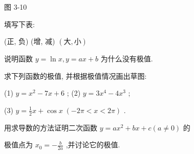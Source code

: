 \documentclass[lang=cn,newtx,10pt,scheme=chinese]{elegantbook}
\begin{document}
图 3-10

\begin{problemset}[练习]

\item 填写下表:

\begin{center}
\end{center}

(正, 负) (增, 减) \(\left( {大,小}\right)\)

\item 说明函数 \(y = \ln x,y = {ax} + b\) 为什么没有极值.

\item 求下列函数的极值, 并根据极值情况画出草图:

(1) \(y = {x}^{2} - {7x} + 6\) ; (2) \(y = 3{x}^{4} - 4{x}^{3}\) ;

(3) \(y = \frac{1}{2}x + \cos x\;\left( {-{2\pi } < x < {2\pi }}\right)\) .

\item 用求导数的方法证明二次函数 \(y = a{x}^{2} + {bx} + c\left( {a \neq 0}\right)\) 的

极值点为 \({x}_{0} = - \frac{b}{2a}\) ,并讨论它的极值.

\end{problemset}
\end{document}
